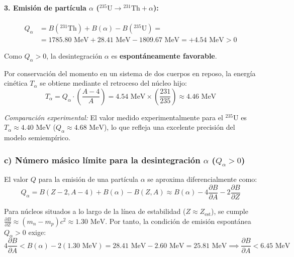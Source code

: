 \begin{problema}
\paragraph{3. Emisión de partícula $\alpha$ (${}^{235}\text{U} \to {}^{231}\text{Th} + \alpha$):}

\[
\begin{array}{rl}
    Q_\alpha & \displaystyle = B({}^{231}\text{Th}) + B(\alpha) - B({}^{235}\text{U}) = \\[4pt]
    & \displaystyle = 1785.80\text{ MeV} + 28.41\text{ MeV} - 1809.67\text{ MeV} = +4.54\text{ MeV} > 0
\end{array}
\]

Como $Q_\alpha > 0$, la desintegración $\alpha$ es \textbf{espontáneamente favorable}.

Por conservación del momento en un sistema de dos cuerpos en reposo, la energía cinética $T_\alpha$ se obtiene mediante el retroceso del núcleo hijo:
\begin{equation}
T_\alpha = Q_\alpha \cdot \left( \frac{A - 4}{A} \right) = 4.54\text{ MeV} \times \left( \frac{231}{235} \right) \approx 4.46\text{ MeV}
\end{equation}

\textit{Comparación experimental:} El valor medido experimentalmente para el ${}^{235}\text{U}$ es $T_\alpha \approx 4.40\text{ MeV}$ ($Q_\alpha \approx 4.68\text{ MeV}$), lo que refleja una excelente precisión del modelo semiempírico.

\subsubsection*{c) Número másico límite para la desintegración $\alpha$ ($Q_\alpha > 0$)}

El valor $Q$ para la emisión de una partícula $\alpha$ se aproxima diferencialmente como:
\begin{equation}
Q_\alpha = B(Z-2, A-4) + B(\alpha) - B(Z,A) \approx B(\alpha) - 4 \frac{\partial B}{\partial A} - 2 \frac{\partial B}{\partial Z}
\end{equation}

Para núcleos situados a lo largo de la línea de estabilidad ($Z \approx Z_{\text{est}}$), se cumple $\frac{\partial B}{\partial Z} \approx (m_n - m_p)c^2 \approx 1.30\text{ MeV}$. Por tanto, la condición de emisión espontánea $Q_\alpha > 0$ exige:
\begin{equation}
4 \frac{\partial B}{\partial A} < B(\alpha) - 2(1.30\text{ MeV}) = 28.41\text{ MeV} - 2.60\text{ MeV} = 25.81\text{ MeV} \implies \frac{\partial B}{\partial A} < 6.45\text{ MeV}
\end{equation}


\end{problema}
